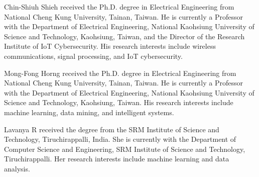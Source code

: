 \documentclass{ieeeaccess}
\theoremstyle{definition}
\theoremstyle{plain}
\begin{document}
\begin{IEEEbiographynophoto}{Chin-Shiuh Shieh}
received the Ph.D. degree in Electrical Engineering from National Cheng Kung University, Tainan, Taiwan. He is currently a Professor with the Department of Electrical Engineering, National Kaohsiung University of Science and Technology, Kaohsiung, Taiwan, and the Director of the Research Institute of IoT Cybersecurity. His research interests include wireless communications, signal processing, and IoT cybersecurity.
\end{IEEEbiographynophoto}

\begin{IEEEbiographynophoto}{Mong-Fong Horng}
received the Ph.D. degree in Electrical Engineering from National Cheng Kung University, Tainan, Taiwan. He is currently a Professor with the Department of Electrical Engineering, National Kaohsiung University of Science and Technology, Kaohsiung, Taiwan. His research interests include machine learning, data mining, and intelligent systems.
\end{IEEEbiographynophoto}

\begin{IEEEbiographynophoto}{Lavanya R}
received the degree from the SRM Institute of Science and Technology, Tiruchirappalli, India. She is currently with the Department of Computer Science and Engineering, SRM Institute of Science and Technology, Tiruchirappalli. Her research interests include machine learning and data analysis.
\end{IEEEbiographynophoto}

\EOD
\end{document}
